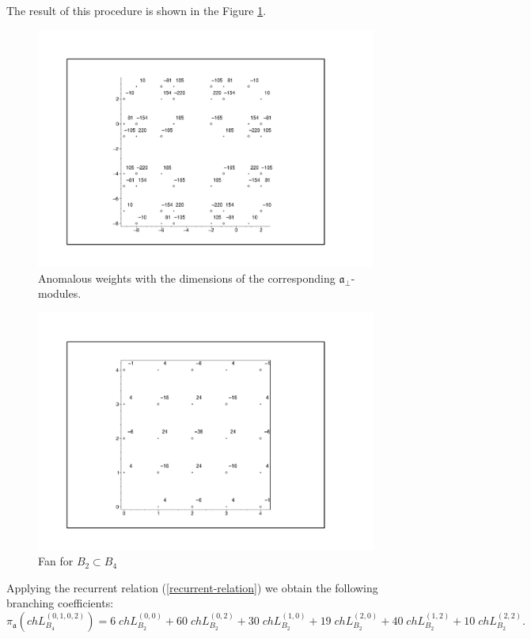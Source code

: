 \documentclass[a4paper,12pt]{article}
\theoremstyle{definition} \newtheorem{Def}{Definition}
\begin{document}
The result of this procedure is shown in the Figure \ref{fig:B4B2anom}.
\begin{figure}[h!tb]
    \includegraphics[width=150mm]{B4_B2_anom_points.pdf}
  \caption{Anomalous weights with the dimensions of the corresponding $\mathfrak{a}_{\bot}$-modules.}
  \label{fig:B4B2anom}
\end{figure}


\begin{figure}[h!tb]
  \includegraphics[width=130mm]{B4_B2_fan.pdf}
  \caption{Fan for $B_2\subset B_4$}
  \label{fig:B4B2Fan}
\end{figure}
Applying the recurrent relation (\ref{recurrent-relation}) we obtain the
following branching coefficients:
\begin{equation}
  \label{eq:24}
  \pi_{\mathfrak{a}} \left(ch L^{(0,1,0,2)}_{B_4}\right) = 6 \; ch L^{(0,0)}_{B_2}+ 60
  \; ch L_{B_2}^{(0,2)}+ 30 \; ch L_{B_2}^{(1,0)}+ 19 \; ch L_{B_2}^{(2,0)}+
  40 \; ch L_{B_2}^{(1,2)}+ 10 \; ch L_{B_2}^{(2,2)}.
\end{equation}
\end{document}
